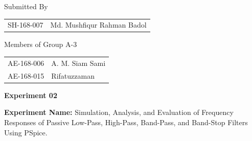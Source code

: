 \documentclass[12pt,a4paper]{article}
\begin{document}
\begin{titlepage}
\vspace{0.9cm}

{Submitted By\par}
\vspace{0.2cm}
\hspace*{0.17\textwidth}%
\begin{tabular}{@{}p{}p{}@{}}
SH-168-007 & Md. Mushfiqur Rahman Badol
\end{tabular}

\vspace{0.6cm}

{Members of Group A-3\par}
\vspace{0.2cm}
\hspace*{0.17\textwidth}%
\begin{tabular}{@{}p{}p{}@{}}
AE-168-006 & A. M. Siam Sami \\
AE-168-015 & Rifatuzzaman
\end{tabular}

\end{titlepage}

\setcounter{page}{1}
\pagestyle{plain}

\textbf{Experiment 02}

\textbf{Experiment Name:} Simulation, Analysis, and Evaluation of Frequency Responses of Passive Low-Pass, High-Pass, Band-Pass, and Band-Stop Filters Using PSpice.

\vspace{0.35cm}
\end{document}
